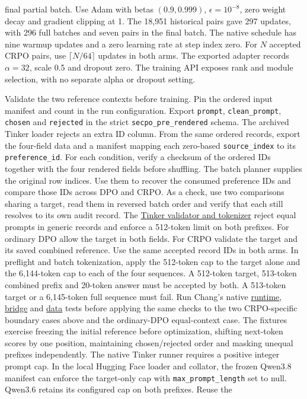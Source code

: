 \documentclass[11pt]{article}
\begin{document}
final partial batch. Use Adam with betas $(0.9,0.999)$, $\epsilon=10^{-8}$, zero weight decay and gradient clipping at 1. The 18,951 historical pairs gave 297 updates, with 296 full batches and seven pairs in the final batch. The native schedule has nine warmup updates and a zero learning rate at step index zero. For $N$ accepted CRPO pairs, use $\lceil N/64\rceil$ updates in both arms. The exported adapter records $\alpha=32$, scale 0.5 and dropout zero. The training API exposes rank and module selection, with no separate alpha or dropout setting.

Validate the two reference contexts before training. Pin the ordered input manifest and count in the run configuration. Export \texttt{prompt}, \texttt{clean\_prompt}, \texttt{chosen} and \texttt{rejected} in the strict \texttt{secpo\_pre\_rendered} schema. The archived Tinker loader rejects an extra ID column. From the same ordered records, export the four-field data and a manifest mapping each zero-based \texttt{source\_index} to its \texttt{preference\_id}. For each condition, verify a checksum of the ordered IDs together with the four rendered fields before shuffling. The batch planner supplies the original row indices. Use them to recover the consumed preference IDs and compare those IDs across DPO and CRPO. As a check, use two comparisons sharing a target, read them in reversed batch order and verify that each still resolves to its own audit record. The \href{https://github.com/0315jaewon/SecPO-test/blob/42280080f0f9224717f40a53928a761e554e1db0/src/secpo/tinker/data.py}{Tinker validator and tokenizer} reject equal prompts in generic records and enforce a 512-token limit on both prefixes. For ordinary DPO allow the target in both fields. For CRPO validate the target and its saved combined reference. Use the same accepted record IDs in both arms. In preflight and batch tokenization, apply the 512-token cap to the target alone and the 6,144-token cap to each of the four sequences. A 512-token target, 513-token combined prefix and 20-token answer must be accepted by both. A 513-token target or a 6,145-token full sequence must fail. Run Chang's native \href{https://github.com/0315jaewon/SecPO-test/blob/42280080f0f9224717f40a53928a761e554e1db0/tests/test_tinker_runtime.py}{runtime}, \href{https://github.com/0315jaewon/SecPO-test/blob/42280080f0f9224717f40a53928a761e554e1db0/tests/test_tinker_bridge.py}{bridge} and \href{https://github.com/0315jaewon/SecPO-test/blob/42280080f0f9224717f40a53928a761e554e1db0/tests/test_tinker_data.py}{data} tests before applying the same checks to the two CRPO-specific boundary cases above and the ordinary-DPO equal-context case. The fixtures exercise freezing the initial reference before optimization, shifting next-token scores by one position, maintaining chosen/rejected order and masking unequal prefixes independently. The native Tinker runner requires a positive integer prompt cap. In the local Hugging Face loader and collator, the frozen Qwen3.8 manifest can enforce the target-only cap with \texttt{max\_prompt\_length} set to null. Qwen3.6 retains its configured cap on both prefixes. Reuse the 
\end{document}
